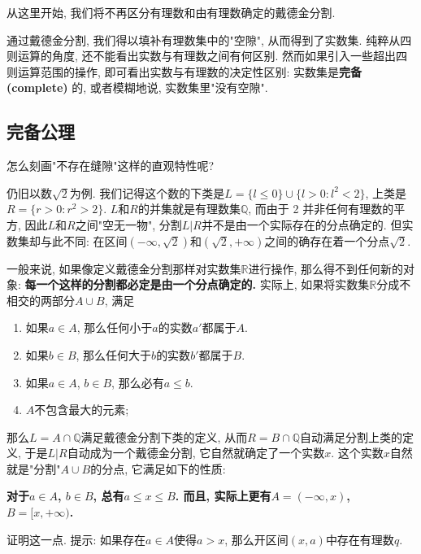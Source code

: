 

从这里开始, 我们将不再区分有理数和由有理数确定的戴德金分割. 

通过戴德金分割, 我们得以填补有理数集中的"空隙", 从而得到了实数集. 纯粹从四则运算的角度, 还不能看出实数与有理数之间有何区别. 然而如果引入一些超出四则运算范围的操作, 即可看出实数与有理数的决定性区别: 实数集是\textbf{完备 (complete)} 的, 或者模糊地说, 实数集里"没有空隙".

\subsection{完备公理}

怎么刻画"不存在缝隙"这样的直观特性呢?

仍旧以数$\sqrt{2}$为例. 我们记得这个数的下类是$L=\{l\leq0\}\cup\{l>0:l^2<2\}$, 上类是$R=\{r>0:r^2>2\}$. $L$和$R$的并集就是有理数集$\mathbb{Q}$, 而由于 2 并非任何有理数的平方, 因此$L$和$R$之间"空无一物", 分割$L|R$并不是由一个实际存在的分点确定的. 但实数集却与此不同: 在区间$(-\infty,\sqrt{2})$和$(\sqrt{2},+\infty)$之间的确存在着一个分点$\sqrt{2}$. 

一般来说, 如果像定义戴德金分割那样对实数集$\mathbb{R}$进行操作, 那么得不到任何新的对象: \textbf{每一个这样的分割都必定是由一个分点确定的.} 实际上, 如果将实数集$\mathbb{R}$分成不相交的两部分$A\cup B$, 满足

\begin{enumerate}
\item 如果$a\in A$, 那么任何小于$a$的实数$a'$都属于$A$.
\item 如果$b\in B$, 那么任何大于$b$的实数$b'$都属于$B$.
\item 如果$a\in A$, $b\in B$, 那么必有$a\leq b$.
\item $A$不包含最大的元素;
\end{enumerate}

那么$L=A\cap\mathbb{Q}$满足戴德金分割下类的定义, 从而$R=B\cap\mathbb{Q}$自动满足分割上类的定义, 于是$L|R$自动成为一个戴德金分割, 它自然就确定了一个实数$x$. 这个实数$x$自然就是"分割"$A\cup B$的分点, 它满足如下的性质:

\textbf{对于$a\in A$, $b\in B$, 总有$a\leq x\leq B$. 而且, 实际上更有$A=(-\infty,x)$, $B=[x,+\infty)$.}

\begin{exercise}{}
证明这一点. 提示: 如果存在$a\in A$使得$a>x$, 那么开区间$(x,a)$中存在有理数$q$.
\end{exercise}

